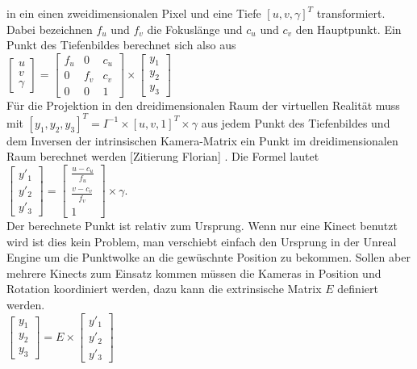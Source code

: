 \documentclass[a4paper]{IEEEtran}
\begin{document}
	in ein einen zweidimensionalen Pixel und eine Tiefe $[u,v,\gamma]^T$ transformiert. 
	Dabei bezeichnen $f_u$ und $f_v$ die Fokuslänge und $c_u$ und $c_v$ den Hauptpunkt. 
	Ein Punkt des Tiefenbildes berechnet sich also aus \\[1cm]

$\begin{bmatrix}
u \\
v \\
\gamma
\end{bmatrix}
= \begin{bmatrix}
f_u & 0 & c_u  \\
0 & f_v & c_v  \\
0 & 0 & 1  
\end{bmatrix}
\times
\begin{bmatrix}
y_1 \\
y_2 \\
y_3
\end{bmatrix}$\\[1cm]

	Für die Projektion in den dreidimensionalen Raum der virtuellen Realität muss mit $[y_1,y_2,y_3]^T = I^{-1} \times [u,v,1]^T \times \gamma$ aus jedem Punkt des Tiefenbildes und dem Inversen der intrinsischen Kamera-Matrix ein Punkt im dreidimensionalen Raum berechnet werden [Zitierung Florian] \cite{ITM07_BrunnSawo}.
	Die Formel lautet \\[1cm]

$\begin{bmatrix}
y'_1 \\
y'_2 \\
y'_3
\end{bmatrix}
= \begin{bmatrix}
\frac{u - c_u}{f_u} \\
\frac{v - c_v}{f_v}  \\
1  
\end{bmatrix}
\times
\gamma$.\\[1cm]

	Der berechnete Punkt ist relativ zum Ursprung. 
	Wenn nur eine Kinect benutzt wird ist dies kein Problem, man verschiebt einfach den Ursprung in der Unreal Engine um die Punktwolke an die gewüschnte Position zu bekommen. 
	Sollen aber mehrere Kinects zum Einsatz kommen müssen die Kameras in Position und Rotation koordiniert werden, dazu kann die extrinsische Matrix $E$ definiert werden. \\[1cm]

$\begin{bmatrix}
y_1 \\
y_2 \\
y_3
\end{bmatrix}
= E
\times
\begin{bmatrix}
y'_1 \\
y'_2 \\
y'_3
\end{bmatrix}$\\[1cm]
\end{document}
